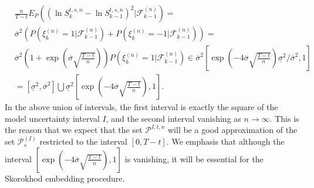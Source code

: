 \documentclass{amsart}
\numberwithin{equation}{section}
\begin{document}
\begin{eqnarray*}
&\frac{n}{T-t}E_P \left(\left(\ln{S^{t,s,n}_{k}}-\ln{S^{t,s,n}_{k-1}}\right)^2\big|\mathcal F^{(n)}_{k-1}\right)=\\
&\overline{\sigma}^2
\left(P(\xi^{(n)}_k=1|\mathcal F^{(n)}_{k-1})+P(\xi^{(n)}_k=-1|\mathcal F^{(n)}_{k-1})\right)
=\\
&\overline{\sigma}^2\left(1+\exp\left(\overline{\sigma}\sqrt{\frac{T-t}{n}}\right)\right)P(\xi^{(n)}_k=1|\mathcal F^{(n)}_{k-1})
\in \overline{\sigma}^2\left[\exp\left(-4\overline{\sigma}\sqrt{\frac{T-t}{n}}\right)\underline{\sigma}^2/\overline{\sigma}^2,1\right]\\
&=\left[\underline{\sigma}^2,\overline{\sigma}^2\right]\bigcup \underline{\sigma}^2\left[\exp\left(-4\overline{\sigma}\sqrt{\frac{T-t}{n}}\right),1\right].
\end{eqnarray*}
In the above union of intervals, the first interval is exactly the square of the model uncertainty interval $I$,
and the second interval vanishing as $n\rightarrow\infty$.
This is the reason that we expect
that the set $\mathcal{P}^{I,t,n}$ will be a good approximation of the set $\mathcal P^{(I)}_s$ restricted to the interval $[0,T-t]$. We emphasis that
although the interval $\left[\exp\left(-4\overline{\sigma}\sqrt{\frac{T-t}{n}}\right),1\right]$
is vanishing,
it will be essential for the Skorokhod embedding procedure.
\end{document}
